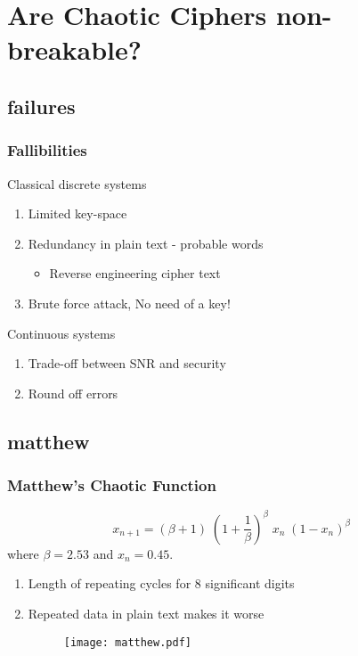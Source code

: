 \documentclass[xcolor=dvipsnames]{beamer}
\begin{document}
\section[Code Breaking]{Are Chaotic Ciphers non-breakable?}
\subsection*{failures}
\begin{frame}
\frametitle{Fallibilities}
\begin{block}{Classical discrete systems}
\end{block}
\begin{enumerate}
\item
Limited \alert{key-space}
\newline
\item
Redundancy in plain text - \alert{probable words}
\newline
\begin{itemize}
\item
Reverse engineering cipher text
\end{itemize}
\vspace{0.1in}
\item
Brute force attack, \alert{No need of a key!}
\end{enumerate}

\begin{block}{Continuous systems}
\end{block}
\begin{enumerate}
\item
\alert{Trade-off} between SNR and security
\newline
\item
Round off errors
\newline
\end{enumerate}
\end{frame}

\subsection*{matthew}
\begin{frame}
\frametitle{Matthew's Chaotic Function}
\begin{equation*}
x_{n+1} = (\beta + 1)\;(1 + \frac{1}{\beta})^{\beta}\;x_n\;(1 - x_n)^{\beta}
\end{equation*}
where $\beta = 2.53$ and $x_n = 0.45$.
\newline
\begin{enumerate}
\item
Length of repeating cycles for 8 significant digits
\newline
\item
Repeated data in plain text makes it worse
\begin{figure}
\centering
\texttt{[image: matthew.pdf]}
\end{figure}
\end{enumerate}
\end{frame}
\end{document}
